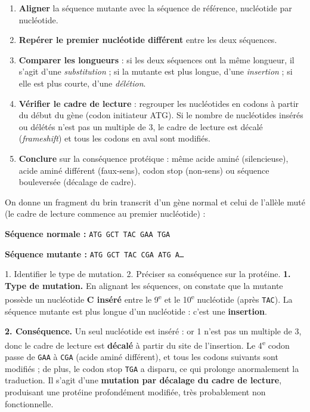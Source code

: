 \documentclass[11pt]{article}
\begin{document}
\begin{methode}
\begin{enumerate}
\item \textbf{Aligner} la séquence mutante avec la séquence de référence, nucléotide par nucléotide.
\item \textbf{Repérer le premier nucléotide différent} entre les deux séquences.
\item \textbf{Comparer les longueurs} : si les deux séquences ont la même longueur, il s'agit d'une \emph{substitution} ; si la mutante est plus longue, d'une \emph{insertion} ; si elle est plus courte, d'une \emph{délétion}.
\item \textbf{Vérifier le cadre de lecture} : regrouper les nucléotides en codons à partir du début du gène (codon initiateur ATG). Si le nombre de nucléotides insérés ou délétés n'est pas un multiple de 3, le cadre de lecture est décalé (\emph{frameshift}) et tous les codons en aval sont modifiés.
\item \textbf{Conclure} sur la conséquence protéique : même acide aminé (silencieuse), acide aminé différent (faux-sens), codon stop (non-sens) ou séquence bouleversée (décalage de cadre).
\end{enumerate}
\end{methode}

\begin{exoresolu}
On donne un fragment du brin transcrit d'un gène normal et celui de l'allèle muté (le cadre de lecture commence au premier nucléotide) :

\textbf{Séquence normale :} \texttt{ATG GCT TAC GAA TGA}

\textbf{Séquence mutante :} \texttt{ATG GCT TAC CGA ATG A\ldots}

1. Identifier le type de mutation. 2. Préciser sa conséquence sur la protéine.
\tcblower
\textbf{1. Type de mutation.} En alignant les séquences, on constate que la mutante possède un nucléotide \textbf{C inséré} entre le 9\textsuperscript{e} et le 10\textsuperscript{e} nucléotide (après \texttt{TAC}). La séquence mutante est plus longue d'un nucléotide : c'est une \textbf{insertion}.

\textbf{2. Conséquence.} Un seul nucléotide est inséré : or 1 n'est pas un multiple de 3, donc le cadre de lecture est \textbf{décalé} à partir du site de l'insertion. Le 4\textsuperscript{e} codon passe de \texttt{GAA} à \texttt{CGA} (acide aminé différent), et tous les codons suivants sont modifiés ; de plus, le codon stop \texttt{TGA} a disparu, ce qui prolonge anormalement la traduction. Il s'agit d'une \textbf{mutation par décalage du cadre de lecture}, produisant une protéine profondément modifiée, très probablement non fonctionnelle.
\end{exoresolu}
\end{document}
